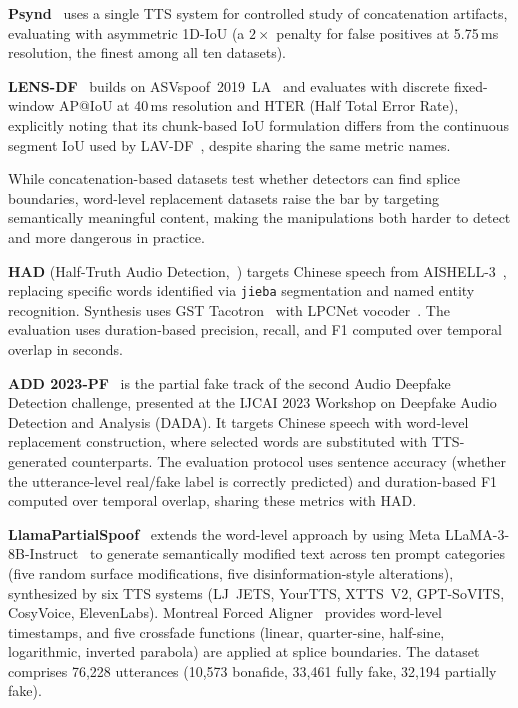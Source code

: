 \documentclass[journal]{IEEEtran}
\begin{document}
\textbf{Psynd}~\cite{zhang2022localizing} uses a single TTS system for controlled study of concatenation artifacts, evaluating with asymmetric 1D-IoU (a $2\times$ penalty for false positives at 5.75\,ms resolution, the finest among all ten datasets).

\textbf{LENS-DF}~\cite{liu2025lensdf} builds on ASVspoof~2019~LA~\cite{wang2020asvspoof2019} and evaluates with discrete fixed-window AP@IoU at 40\,ms resolution and HTER (Half Total Error Rate), explicitly noting that its chunk-based IoU formulation differs from the continuous segment IoU used by LAV-DF~\cite{cai2022lavdf}, despite sharing the same metric names.

While concatenation-based datasets test whether detectors can find splice boundaries, word-level replacement datasets raise the bar by targeting semantically meaningful content, making the manipulations both harder to detect and more dangerous in practice.

\textbf{HAD} (Half-Truth Audio Detection,~\cite{yi2021had}) targets Chinese speech from AISHELL-3~\cite{shi2021aishell3}, replacing specific words identified via \texttt{jieba} segmentation and named entity recognition. Synthesis uses GST Tacotron~\cite{wang2018gst} with LPCNet vocoder~\cite{valin2019lpcnet}. The evaluation uses duration-based precision, recall, and F1 computed over temporal overlap in seconds.

\textbf{ADD 2023-PF}~\cite{yi2023add} is the partial fake track of the second Audio Deepfake Detection challenge, presented at the IJCAI 2023 Workshop on Deepfake Audio Detection and Analysis (DADA). It targets Chinese speech with word-level replacement construction, where selected words are substituted with TTS-generated counterparts. The evaluation protocol uses sentence accuracy (whether the utterance-level real/fake label is correctly predicted) and duration-based F1 computed over temporal overlap, sharing these metrics with HAD.

\textbf{LlamaPartialSpoof}~\cite{luong2025llamapartialspoof} extends the word-level approach by using Meta LLaMA-3-8B-Instruct~\cite{dubey2024llama3} to generate semantically modified text across ten prompt categories (five random surface modifications, five disinformation-style alterations), synthesized by six TTS systems (LJ~JETS, YourTTS, XTTS~V2, GPT-SoVITS, CosyVoice, ElevenLabs). Montreal Forced Aligner~\cite{mcauliffe2017mfa} provides word-level timestamps, and five crossfade functions (linear, quarter-sine, half-sine, logarithmic, inverted parabola) are applied at splice boundaries. The dataset comprises 76,228 utterances (10,573 bonafide, 33,461 fully fake, 32,194 partially fake).
\end{document}
